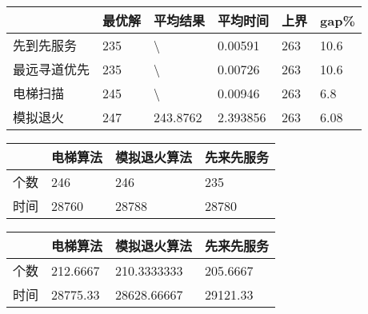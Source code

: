 \begin{table}[htbp]
	\centering
	\caption{两道工序算法比较}
	\label{两道工序算法比较}
	\begin{longtabu}to
		\toprule
		  & 最优解 & 平均结果             & 平均时间     & 上界  & gap\% \\ \midrule
		先到先服务  & 235 & \textbackslash{} & 0.00591  & 263 & 10.6    \\
		最远寻道优先 & 235 & \textbackslash{} & 0.00726  & 263 &  10.6    \\
		电梯扫描   & 245 & \textbackslash{} & 0.00946  & 263 &  6.8    \\ 
		模拟退火   & 247 & 243.8762         & 2.393856 & 263 &   6.08   \\ \bottomrule
	\end{longtabu}
\end{table}
\begin{table}[htbp]
	\centering
	\caption{无故障时算法比较}
	\label{无故障时算法比较}
	\begin{longtabu}to
		\toprule
		 & 电梯算法  & 模拟退火算法 & 先来先服务  \\ \midrule
		个数 & 246   & 246    & 235   \\
		时间 & 28760 & 28788  & 28780 \\ \bottomrule
	\end{longtabu}
\end{table}
\begin{table}[htbp]
	\centering
	\caption{有故障时算法比较（3组平均）}
	\label{有故障时算法比较（3组平均）}
	\begin{longtabu}to
	\toprule
	 	& 电梯算法     & 模拟退火算法      & 先来先服务     \\ \midrule
	个数 & 212.6667 & 210.3333333 & 205.6667 \\
	时间 & 28775.33 & 28628.66667 & 29121.33 \\ \bottomrule
	\end{longtabu}
\end{table}

